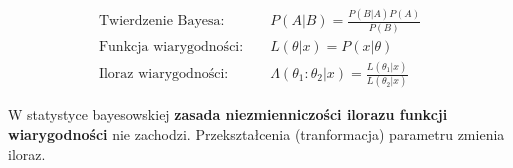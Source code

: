 \begin{align*}
    \text{Twierdzenie Bayesa: } & & P(A|B)=\frac{P(B|A) P(A)}{P(B)} \\
    \text{Funkcja wiarygodności: } & & L(\theta|x)=P(x|\theta) \\
    \text{Iloraz wiarygodności: } & & \Lambda(\theta_1 : \theta_2 | x)=\frac{L(\theta_1 | x)}{L(\theta_2 | x)}
\end{align*}

W statystyce bayesowskiej \textbf{zasada niezmienniczości ilorazu funkcji wiarygodności} nie zachodzi.
Przekształcenia (tranformacja) parametru zmienia iloraz.